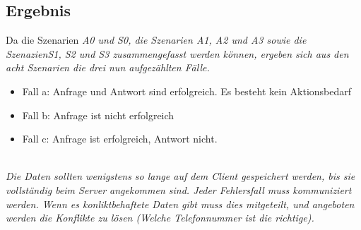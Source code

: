 \subsection*{Ergebnis}
Da die Szenarien \it{A0} und \it{S0}, die Szenarien \it{A1}, \it{A2} und \it{A3} sowie die Szenazien\it{S1}, \it{S2} und \it{S3} zusammengefasst werden können, ergeben sich aus den acht Szenarien die drei nun aufgezählten Fälle.
\begin{itemize}
  \item Fall a: Anfrage und Antwort sind erfolgreich. Es besteht kein Aktionsbedarf 
  \item Fall b: Anfrage ist nicht erfolgreich
  \item Fall c: Anfrage ist erfolgreich, Antwort nicht.
\end{itemize}
\\
\it{Die Daten sollten wenigstens so lange auf dem Client gespeichert werden, bis sie vollständig beim Server angekommen sind. Jeder Fehlersfall muss kommuniziert werden. Wenn es konliktbehaftete Daten gibt muss dies mitgeteilt, und angeboten werden die Konflikte zu lösen (Welche Telefonnummer ist die richtige).}